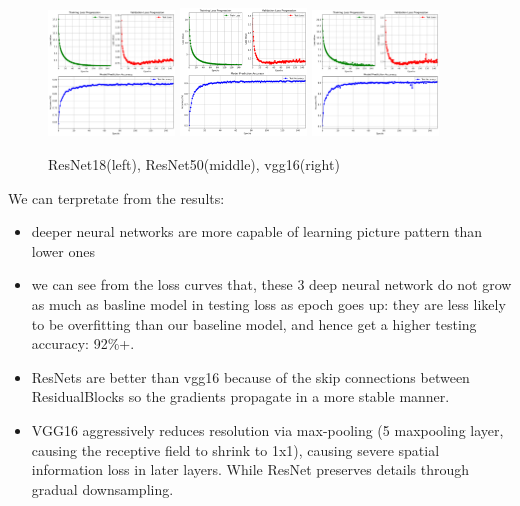 \documentclass{article}
\begin{document}
\begin{figure}[H]
  \centering
  
  \includegraphics[width=0.3\textwidth]{fig/train_result_res18.png} %
  \includegraphics[width=0.3\textwidth]{fig/train_result_res50.png} %
  \includegraphics[width=0.3\textwidth]{fig/train_result_vgg16.png} %
  
  \caption{ ResNet18(left), ResNet50(middle), vgg16(right)} %
  \label{fig:curve} %
\end{figure}
\noindent We can terpretate from the results:
\begin{itemize}
  \item deeper neural networks are more capable of learning picture pattern than lower ones
  \item we can see from the loss curves that, these 3 deep neural network do not grow as much as basline model in testing loss as epoch goes up: they are less likely to be overfitting than our baseline model, and hence get a higher testing accuracy: 92\%+.
  \item ResNets are better than vgg16 because of the skip connections between ResidualBlocks so the gradients propagate in a more stable manner.
  \item VGG16 aggressively reduces resolution via max-pooling (5 maxpooling layer, causing the receptive field to shrink to 1x1), causing severe spatial information loss in later layers. While ResNet preserves details through gradual downsampling.
\end{itemize}
\end{document}
